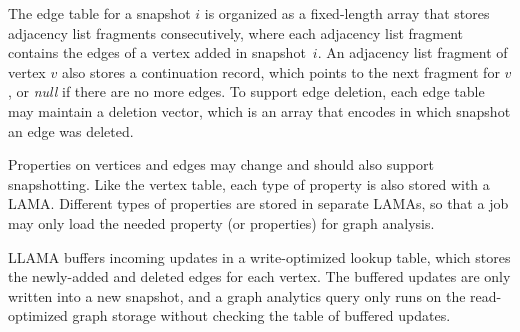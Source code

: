 \documentclass{svjour3}
\begin{document}
The edge table for a snapshot $i$ is organized as a fixed-length array that stores adjacency list fragments consecutively, where each adjacency list fragment contains the edges of a vertex added in snapshot~$i$. An adjacency list fragment of vertex $v$ also stores a continuation record, which points to the next fragment for $v$, or {\em null} if there are no more edges. To support edge deletion, each edge table may maintain a deletion vector, which is an array that encodes in which snapshot an edge was deleted.

Properties on vertices and edges may change and should also support snapshotting. Like the vertex table, each type of property is also stored with a LAMA. Different types of properties are stored in separate LAMAs, so that a job may only load the needed property (or properties) for graph analysis.

LLAMA buffers incoming updates in a write-optimized lookup table, which stores the newly-added and deleted edges for each vertex. The buffered updates are only written into a new snapshot, and a graph analytics query only runs on the read-optimized graph storage without checking the table of buffered updates.





\end{document}
